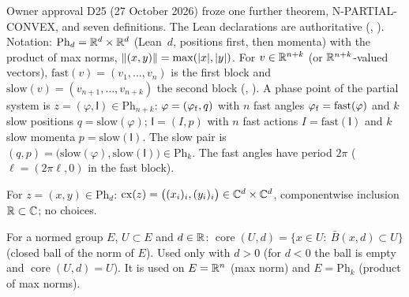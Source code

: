 Owner approval D25 (27 October 2026) froze one further theorem, N-PARTIAL-CONVEX, and seven definitions. The Lean
declarations are authoritative (\texttt{},
\texttt{}).
Notation: $\mathrm{Ph}_d=\mathbb{R}^d\times\mathbb{R}^d$ (Lean \,$d$, positions first, then momenta) with the product of max norms,
$\lVert (x,y)\rVert=\max(\lvert x\rvert,\lvert y\rvert)$. For $v\in\mathbb{R}^{n+k}$ (or $\mathbb{R}^{n+k}$-valued vectors), $\mathrm{fast}(v)=(v_1,\dots,v_n)$ is the first block and
$\mathrm{slow}(v)=(v_{n+1},\dots,v_{n+k})$ the second block (, ).
A phase point of the partial system is $z=(\varphi,\mathsf I)\in\mathrm{Ph}_{n+k}$: $\varphi=(\varphi_{\rm f},q)$ with $n$ fast angles $\varphi_{\rm f}=\mathrm{fast}(\varphi)$ and
$k$ slow positions $q=\mathrm{slow}(\varphi)$; $\mathsf I=(I,p)$ with $n$ fast actions $I=\mathrm{fast}(\mathsf I)$ and $k$ slow momenta $p=\mathrm{slow}(\mathsf I)$. The slow pair is $(q,p)=\bigl(\mathrm{slow}(\varphi),\mathrm{slow}(\mathsf I)\bigr)\in\mathrm{Ph}_k$.
The fast angles have period $2\pi$ (\,$\ell=(2\pi\ell,0)$ in the fast block).

\begin{definition}\label{bpN:p0:partial-complexify}
For $z=(x,y)\in\mathrm{Ph}_d$: $\mathrm{cx}(z)=\bigl((x_i)_i,(y_i)_i\bigr)\in\mathbb{C}^d\times\mathbb{C}^d$, componentwise inclusion $\mathbb{R}\subset\mathbb{C}$; no choices.
\end{definition}

\begin{definition}\label{bpN:p0:partial-core}
For a normed group $E$, $U\subset E$ and $d\in\mathbb{R}$: $\operatorname{core}(U,d)=\{x\in U:\ \bar B(x,d)\subset U\}$ (closed ball of the norm of $E$). Used only with $d>0$ (for $d<0$ the ball is empty and $\operatorname{core}(U,d)=U$).
It is used on $E=\mathbb{R}^n$ (max norm) and $E=\mathrm{Ph}_k$ (product of max norms).
\end{definition}

